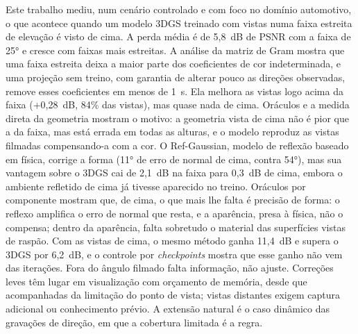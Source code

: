 Este trabalho mediu, num cenário controlado e com foco no domínio automotivo, o que acontece quando um modelo 3DGS treinado com vistas numa faixa estreita de elevação é visto de cima. A perda média é de 5,8~dB de PSNR com a faixa de 25° e cresce com faixas mais estreitas. A análise da matriz de Gram mostra que uma faixa estreita deixa a maior parte dos coeficientes de cor indeterminada, e uma projeção sem treino, com garantia de alterar pouco as direções observadas, remove esses coeficientes em menos de 1~s. Ela melhora as vistas logo acima da faixa (+0,28~dB, 84\% das vistas), mas quase nada de cima. Oráculos e a medida direta da geometria mostram o motivo: a geometria vista de cima não é pior que a da faixa, mas está errada em todas as alturas, e o modelo reproduz as vistas filmadas compensando-a com a cor. O Ref-Gaussian, modelo de reflexão baseado em física, corrige a forma (11° de erro de normal de cima, contra 54°), mas sua vantagem sobre o 3DGS cai de 2,1~dB na faixa para 0,3~dB de cima, embora o ambiente refletido de cima já tivesse aparecido no treino. Oráculos por componente mostram que, de cima, o que mais lhe falta é precisão de forma: o reflexo amplifica o erro de normal que resta, e a aparência, presa à física, não o compensa; dentro da aparência, falta sobretudo o material das superfícies vistas de raspão. Com as vistas de cima, o mesmo método ganha 11,4~dB e supera o 3DGS por 6,2~dB, e o controle por \textit{checkpoints} mostra que esse ganho não vem das iterações. Fora do ângulo filmado falta informação, não ajuste. Correções leves têm lugar em visualização com orçamento de memória, desde que acompanhadas da limitação do ponto de vista; vistas distantes exigem captura adicional ou conhecimento prévio. A extensão natural é o caso dinâmico das gravações de direção, em que a cobertura limitada é a regra.
